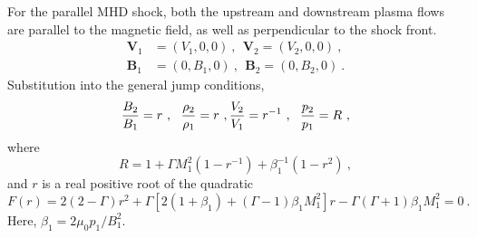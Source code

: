 \documentclass[12pt,a4paper]{article}
\renewcommand{\vec}[1]{\boldsymbol{#1}}
\begin{document}
\cite{Plasma2014} For the parallel MHD shock, both the upstream and downstream plasma flows are parallel to the magnetic field, as well as perpendicular to the shock front.
\begin{align}
\vec{V}_1 &= (V_1, 0, 0) ~,  ~~ \vec{V}_2 = (V_2, 0, 0) ~, \\
\vec{B}_1 &= (0, B_1, 0) ~,  ~~ \vec{B}_2 = (0, B_2, 0) ~.
\end{align}
Substitution into the general jump conditions,
\begin{equation}
\dfrac{B_2}{B_1} = r ~, ~~ \dfrac{\rho_2}{\rho_1} = r ~, \\
\dfrac{V_2}{V_1} = r^{-1} ~, ~~ \dfrac{p_2}{p_1} = R ~, 
\end{equation}
where
\begin{equation}
R = 1 + \Gamma M_1^2 (1-r^{-1}) +\beta_1^{-1} (1-r^2) ~,
\end{equation}
and $r$ is a real positive root of the quadratic
\begin{equation}
F(r) = 2(2-\Gamma) r^2 +\Gamma[2(1+\beta_1) +(\Gamma-1)\beta_1 M_1^2] r - \Gamma(\Gamma +1) \beta_1 M_1^2 = 0 ~.
\end{equation}
Here, $\beta_1 = 2\mu_0 p_1 /B_1^2$. 
 
\end{document}
